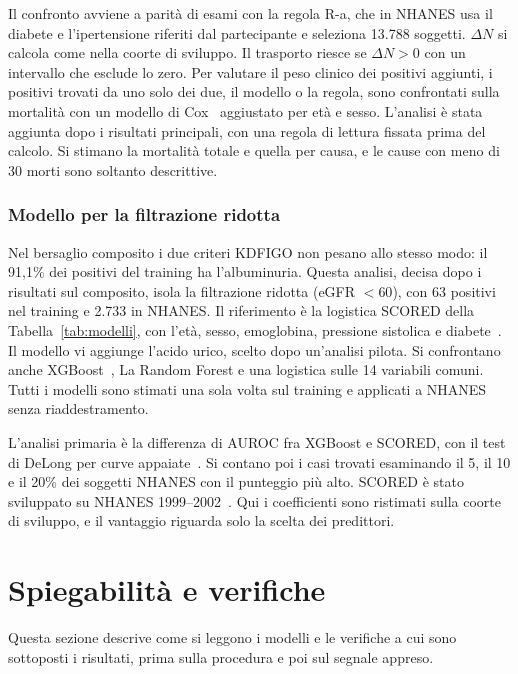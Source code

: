 \documentclass[a4paper, 12pt, oneside]{book}
\begin{document}
Il confronto avviene a parità di esami con la regola R-a, che in NHANES usa il diabete e l'ipertensione riferiti dal partecipante e seleziona 13.788 soggetti. $\Delta N$ si calcola come nella coorte di sviluppo. Il trasporto riesce se $\Delta N > 0$ con un intervallo che esclude lo zero. Per valutare il peso clinico dei positivi aggiunti, i positivi trovati da uno solo dei due, il modello o la regola, sono confrontati sulla mortalità con un modello di Cox~\cite{cox_regression_1972} aggiustato per età e sesso. L'analisi è stata aggiunta dopo i risultati principali, con una regola di lettura fissata prima del calcolo. Si stimano la mortalità totale e quella per causa, e le cause con meno di 30 morti sono soltanto descrittive.

\subsubsection{Modello per la filtrazione ridotta}

Nel bersaglio composito i due criteri KDFIGO non pesano allo stesso modo: il 91,1\% dei positivi del training ha l'albuminuria. Questa analisi, decisa dopo i risultati sul composito, isola la filtrazione ridotta (eGFR $< 60$), con 63 positivi nel training e 2.733 in NHANES. Il riferimento è la logistica SCORED della Tabella~\ref{tab:modelli}, con l'età, sesso, emoglobina, pressione sistolica e diabete~\cite{bang_screening_2007}. Il modello vi aggiunge l'acido urico, scelto dopo un'analisi pilota. Si confrontano anche XGBoost~\cite{chen_xgboost_2016}, La Random Forest e una logistica sulle 14 variabili comuni. Tutti i modelli sono stimati una sola volta sul training e applicati a NHANES senza riaddestramento.

L'analisi primaria è la differenza di AUROC fra XGBoost e SCORED, con il test di DeLong per curve appaiate~\cite{delong_comparing_1988}. Si contano poi i casi trovati esaminando il 5, il 10 e il 20\% dei soggetti NHANES con il punteggio più alto. SCORED è stato sviluppato su NHANES 1999--2002~\cite{bang_screening_2007}. Qui i coefficienti sono ristimati sulla coorte di sviluppo, e il vantaggio riguarda solo la scelta dei predittori.

\section{Spiegabilità e verifiche}

Questa sezione descrive come si leggono i modelli e le verifiche a cui sono sottoposti i risultati, prima sulla procedura e poi sul segnale appreso.
\end{document}

